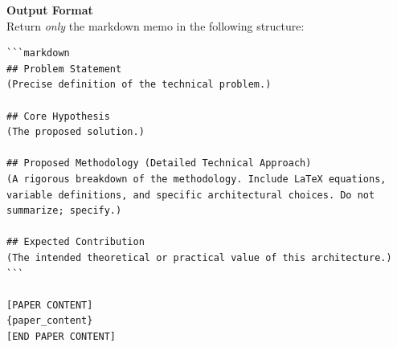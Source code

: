 \vspace{1em}
\noindent\textbf{Output Format}\\
\vspace{0.5em}
Return \textit{only} the markdown memo in the following structure:

\begin{verbatim}
```markdown
## Problem Statement
(Precise definition of the technical problem.)

## Core Hypothesis
(The proposed solution.)

## Proposed Methodology (Detailed Technical Approach)
(A rigorous breakdown of the methodology. Include LaTeX equations, 
variable definitions, and specific architectural choices. Do not 
summarize; specify.)

## Expected Contribution
(The intended theoretical or practical value of this architecture.)
```

[PAPER CONTENT]
{paper_content}
[END PAPER CONTENT]
\end{verbatim}